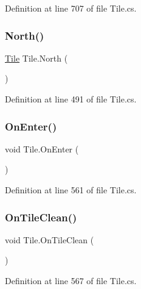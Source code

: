 Definition at line 707 of file Tile.\+cs.

\mbox{\label{class_tile_acc0ae09e957b413c556c4afb6b4b95d5}} 
\subsubsection{\texorpdfstring{North()}{North()}}
{\footnotesize\ttfamily \hyperlink{class_tile}{Tile} Tile.\+North (\begin{DoxyParamCaption}{ }\end{DoxyParamCaption})}



Definition at line 491 of file Tile.\+cs.

\mbox{\label{class_tile_ad0acba5981f6e117788c1c112ac1e443}} 
\subsubsection{\texorpdfstring{On\+Enter()}{OnEnter()}}
{\footnotesize\ttfamily void Tile.\+On\+Enter (\begin{DoxyParamCaption}{ }\end{DoxyParamCaption})}



Definition at line 561 of file Tile.\+cs.

\mbox{\label{class_tile_a1a39799ae879d44cd5c88ba1349e656e}} 
\subsubsection{\texorpdfstring{On\+Tile\+Clean()}{OnTileClean()}}
{\footnotesize\ttfamily void Tile.\+On\+Tile\+Clean (\begin{DoxyParamCaption}{ }\end{DoxyParamCaption})}



Definition at line 567 of file Tile.\+cs.

\mbox{\label{class_tile_ada07c2ba6dd6355e13612b45bfc0c4f0}} 
